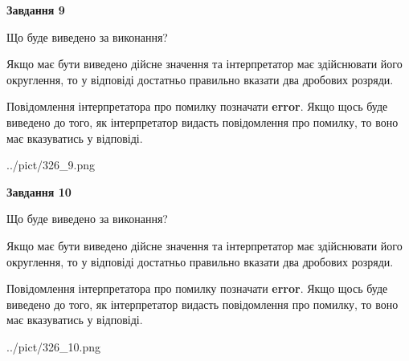 \documentclass[12pt, ukrainian]{article}
\begin{document}
{\begin {Large}
{\begin {center}\textbf{Завдання 9}\end {center}}\par
Що буде виведено за виконання? \par

Якщо має бути виведено дійсне значення та інтерпретатор має здійснювати його округлення, 
то у відповіді достатньо правильно вказати два дробових розряди.

Повідомлення інтерпретатора про помилку позначати \textbf{error}.
Якщо щось буде виведено до того, як інтерпретатор видасть повідомлення про помилку, 
то воно має вказуватись у відповіді. \par

\begin{center}
	{../pict/326_9.png}
\end{center}
\newpage

{\begin {center}\textbf{Завдання 10}\end {center}}\par
Що буде виведено за виконання? \par

Якщо має бути виведено дійсне значення та інтерпретатор має здійснювати його округлення, 
то у відповіді достатньо правильно вказати два дробових розряди.

Повідомлення інтерпретатора про помилку позначати \textbf{error}.
Якщо щось буде виведено до того, як інтерпретатор видасть повідомлення про помилку, 
то воно має вказуватись у відповіді. \par

\begin{center}
	{../pict/326_10.png}
\end{center}
\newpage

\end {Large}}
\end{document}
